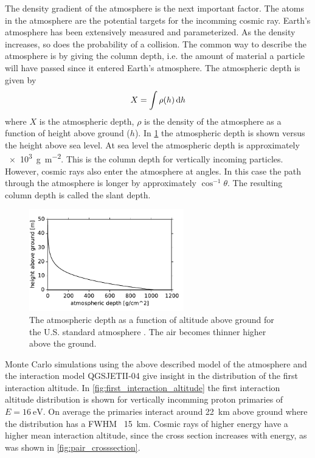 The density gradient of the atmosphere is the next important factor. The atoms in the atmosphere are the potential targets for the incomming cosmic ray. Earth's atmosphere has been extensively measured and parameterized. As the density increases, so does the probability of a collision. The common way to describe the atmosphere is by giving the column depth, i.e. the amount of material a particle will have passed since it entered Earth's atmosphere. The atmospheric depth is given by
%
\begin{equation}
    X = \int \rho(h) \mathop{}\!\mathrm{d} h
\end{equation}
%
where $X$ is the atmospheric depth, $\rho$ is the density of the atmosphere as a function of height above ground ($h$). In \cref{fig:atmospheric_depth} the atmospheric depth is shown versus the height above sea level. At sea level the atmospheric depth is approximately \SI{e3}{\gram\per\meter\squared}. This is the column depth for vertically incoming particles. However, cosmic rays also enter the atmosphere at angles. In this case the path through the atmosphere is longer by approximately $\cos^{-1} \theta$. The resulting column depth is called the slant depth.

\begin{figure}
    \centering
    \includegraphics[width=0.6\textwidth]
                    {plots/cosmic-rays/atmospheric_depth}
    \caption{The atmospheric depth as a function of altitude above ground for the U.S. standard atmosphere \cite{heck2013corsika}. The air becomes thinner higher above the ground.}
    \label{fig:atmospheric_depth}
\end{figure}

Monte Carlo simulations using the above described model of the atmosphere and the interaction model QGSJETII-04 give insight in the distribution of the first interaction altitude. In \cref{fig:first_interaction_altitude} the first interaction altitude distribution is shown for vertically incomming proton primaries of $E = \SI{16}{\eV}$. On average the primaries interact around \SI{22}{\kilo\meter} above ground where the distribution has a FWHM ~\SI{15}{\kilo\meter}. Cosmic rays of higher energy have a higher mean interaction altitude, since the cross section increases with energy, as was shown in \cref{fig:pair_crosssection}.

